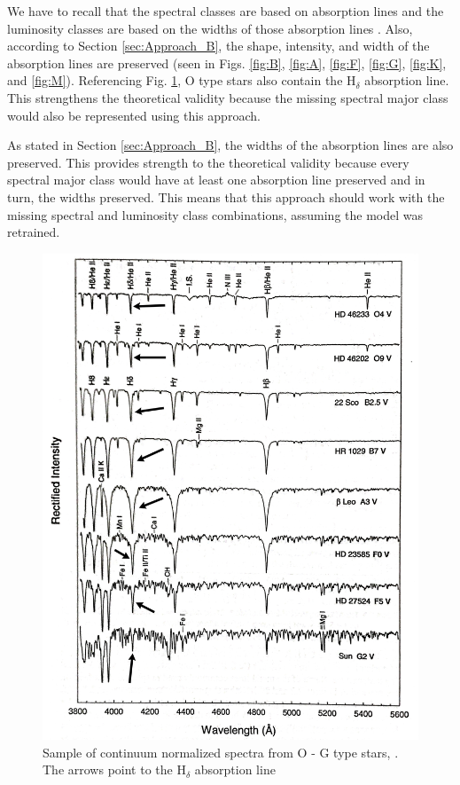 \documentclass[./AutomatedMK.tex]{subfiles}
\begin{document}
We have to recall that the spectral classes are based on absorption lines and the luminosity classes are based on the widths of those absorption lines \citep{Gray}. Also, according to Section \ref{sec:Approach_B}, the shape, intensity, and width of the absorption lines are preserved (seen in Figs. \ref{fig:B}, \ref{fig:A},  \ref{fig:F}, \ref{fig:G}, \ref{fig:K}, and \ref{fig:M}). Referencing Fig. \ref{fig:O}, O type stars also contain the H$_\delta$ absorption line. This strengthens the theoretical validity because the missing spectral major class would also be represented using this approach. 

As stated in Section \ref{sec:Approach_B}, the widths of the absorption lines are also preserved. This provides strength to the theoretical validity because every spectral major class would have at least one absorption line preserved and in turn, the widths preserved. This means that this approach should work with the missing spectral and luminosity class combinations, assuming the model was retrained. 

        \begin{figure}
            \centering
             \includegraphics[width=.5\linewidth]{figures/OStar.jpeg}
            \caption{Sample of continuum normalized spectra from O - G type stars, \citep{Gray}. The arrows point to the H$_\delta$ absorption line}
            \label{fig:O}
        \end{figure}
\end{document}
